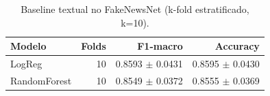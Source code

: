 \begin{table}[H]\centering
\caption{Baseline textual no FakeNewsNet (k-fold estratificado, k=10).}
\label{tab:baseline_textual_fnn}
\begin{tabular}{lrrr}
\toprule
Modelo & Folds & F1-macro & Accuracy \\
\midrule
LogReg & 10 & 0.8593 $\pm$ 0.0431 & 0.8595 $\pm$ 0.0430 \\
RandomForest & 10 & 0.8549 $\pm$ 0.0372 & 0.8555 $\pm$ 0.0369 \\
\bottomrule
\end{tabular}
\end{table}